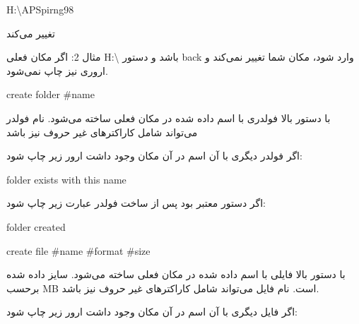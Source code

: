 \documentclass[]{article}
\begin{document}
  \begin{tcolorbox}[boxrule=0pt]
	\begin{latin}
  	  \large{
  	  	 H:\textbackslash APSpirng98 
		}
	\end{latin}
\end{tcolorbox}
   
   
   تغییر می‌کند
   
   
مثال 2:
اگر مکان فعلی
 H:\textbackslash
 باشد و دستور back وارد شود، مکان شما تغییر نمی‌کند و اروری نیز چاپ نمی‌شود.
 
  \begin{tcolorbox}[boxrule=0pt]
	\begin{latin}
  	  \large{
  	  	create folder \#name
		}
	\end{latin}
\end{tcolorbox}

با دستور بالا فولدری با اسم داده شده در مکان فعلی ساخته می‌شود. نام فولدر می‌تواند شامل کاراکترهای غیر حروف نیز باشد

 اگر فولدر دیگری با آن اسم در آن مکان وجود داشت ارور زیر چاپ شود:
 


  \begin{tcolorbox}[boxrule=0pt]
	\begin{latin}
  	  \large{
  	  	folder exists with this name
		}
	\end{latin}
\end{tcolorbox}

اگر دستور معتبر بود پس از ساخت فولدر عبارت زیر چاپ شود:

  \begin{tcolorbox}[boxrule=0pt]
	\begin{latin}
  	  \large{
  	  folder created
		}
	\end{latin}
\end{tcolorbox}

  \begin{tcolorbox}[boxrule=0pt]
	\begin{latin}
  	  \large{
  	 create file \#name \#format \#size
		}
	\end{latin}
\end{tcolorbox}






با دستور بالا فایلی با اسم داده شده در مکان فعلی ساخته می‌شود. سایز داده شده برحسب MB است. نام فایل می‌تواند شامل کاراکترهای غیر حروف نیز باشد.

اگر فایل دیگری با آن اسم در آن مکان وجود داشت ارور زیر چاپ شود:
\end{document}
